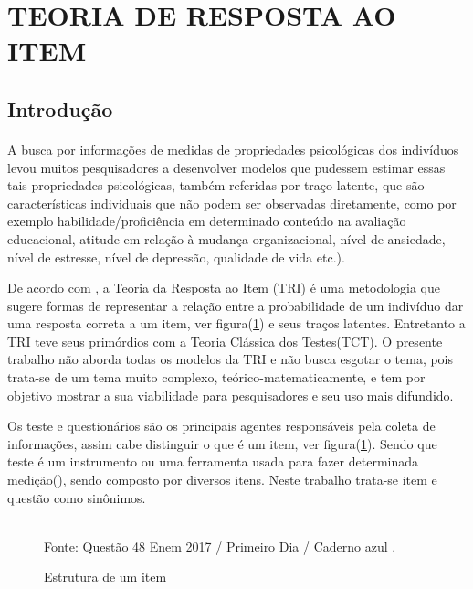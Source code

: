 \section{TEORIA DE RESPOSTA AO ITEM}
	\subsection{Introdução}
	\paragraph{}
	    A busca por informações de medidas de propriedades psicológicas dos indivíduos levou muitos pesquisadores a desenvolver modelos que pudessem estimar essas tais propriedades psicológicas, também referidas por traço latente, que são características individuais que não podem ser observadas diretamente, como por exemplo habilidade/proficiência em determinado conteúdo na avaliação educacional, atitude em relação à mudança organizacional, nível de ansiedade, nível de estresse, nível de depressão, qualidade de vida etc.).\textcite{Araujo}
	\par
		De acordo com \textcite{Dalton}, a Teoria da Resposta ao Item (TRI) é uma metodologia que sugere formas de representar a relação entre a probabilidade de um indivíduo dar uma resposta correta a um item, ver figura(\ref{fig:ques}) e seus traços latentes. Entretanto a TRI teve seus primórdios com a Teoria Clássica dos Testes(TCT). O presente trabalho não aborda todas os modelos da TRI e não busca esgotar o tema, pois trata-se de um tema muito complexo, teórico-matematicamente, e tem por objetivo mostrar a sua viabilidade para pesquisadores e seu uso mais difundido.
	\par
		Os teste e questionários são os principais agentes responsáveis pela coleta de informações, assim cabe distinguir o que é um item, ver figura(\ref{fig:ques}). Sendo que teste é um instrumento ou uma ferramenta usada para fazer determinada medição(\cite{James}), sendo composto por diversos itens. Neste trabalho trata-se item e questão como sinônimos.
	\begin{figure}[!h]
		\centering
		\caption{Estrutura de um item}
		\\
		Fonte: Questão 48 Enem 2017 / Primeiro Dia / Caderno azul .
		\label{fig:ques}
	\end{figure}
